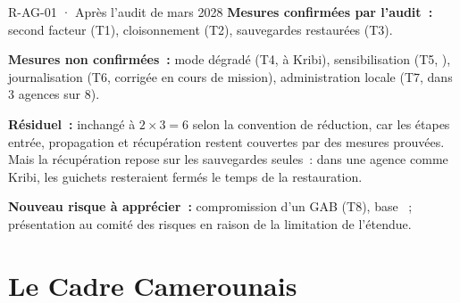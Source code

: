 \begin{boxobjet}{R-AG-01 · Après l'audit de mars 2028}
\textbf{Mesures confirmées par l'audit~:} second facteur (T1),
cloisonnement (T2), sauvegardes restaurées (T3).

\textbf{Mesures non confirmées~:} mode dégradé (T4, \NON{} à Kribi),
sensibilisation (T5, \NEK{}), journalisation (T6, corrigée en cours de
mission), administration locale (T7, \NON{} dans 3 agences sur 8).

\textbf{Résiduel~:} inchangé à $2 \times 3 = 6$ selon la convention de
réduction, car les étapes entrée, propagation et récupération restent
couvertes par des mesures prouvées. Mais la récupération repose sur les
sauvegardes seules~: dans une agence comme Kribi, les guichets resteraient
fermés le temps de la restauration.

\textbf{Nouveau risque à apprécier~:} compromission d'un GAB (T8), base
\NEK{}~; présentation au comité des risques en raison de la limitation de
l'étendue.
\end{boxobjet}

\section{Le Cadre Camerounais}
\label{sec:c06-cadre}

